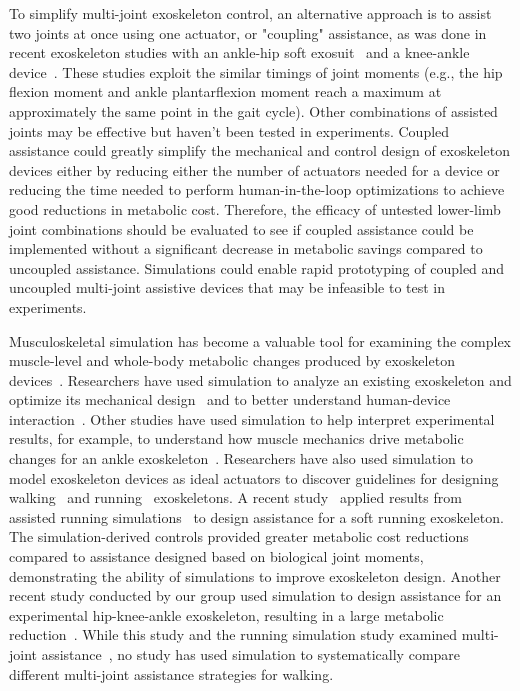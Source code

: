\documentclass[10pt,letterpaper]{article}
\begin{document}
To simplify multi-joint exoskeleton control, an alternative approach is to assist two joints at once using one actuator, or "coupling" assistance, as was done in recent exoskeleton studies with an ankle-hip soft exosuit~\cite{Ding:2017, Panizzolo:2016, Quinlivan:2017, Lee:2018} and a knee-ankle device~\cite{Malcolm:2018}. These studies exploit the similar timings of joint moments (e.g., the hip flexion moment and ankle plantarflexion moment reach a maximum at approximately the same point in the gait cycle). Other combinations of assisted joints may be effective but haven’t been tested in experiments. Coupled assistance could greatly simplify the mechanical and control design of exoskeleton devices either by reducing either the number of actuators needed for a device or reducing the time needed to perform human-in-the-loop optimizations to achieve good reductions in metabolic cost. Therefore, the efficacy of untested lower-limb joint combinations should be evaluated to see if coupled assistance could be implemented without a significant decrease in metabolic savings compared to uncoupled assistance. Simulations could enable rapid prototyping of coupled and uncoupled multi-joint assistive devices that may be infeasible to test in experiments. 

Musculoskeletal simulation has become a valuable tool for examining the complex muscle-level and whole-body metabolic changes produced by exoskeleton devices~\cite{Grabke:2019}. Researchers have used simulation to analyze an existing exoskeleton and optimize its mechanical design~\cite{Manns:2017} and to better understand human-device interaction~\cite{Fournier:2018}. Other studies have used simulation to help interpret experimental results, for example, to understand how muscle mechanics drive metabolic changes for an ankle exoskeleton~\cite{Jackson:2017}. Researchers have also used simulation to model exoskeleton devices as ideal actuators to discover guidelines for designing walking~\cite{Dembia:2017} and running~\cite{Uchida:2016} exoskeletons. A recent study~\cite{Lee:2017} applied results from assisted running simulations~\cite{Uchida:2016} to design assistance for a soft running exoskeleton. The simulation-derived controls provided greater metabolic cost reductions compared to assistance designed based on biological joint moments, demonstrating the ability of simulations to improve exoskeleton design. Another recent study conducted by our group used simulation to design assistance for an experimental hip-knee-ankle exoskeleton, resulting in a large metabolic reduction~\cite{Franks:2020}. While this study and the running simulation study examined multi-joint assistance~\cite{Uchida:2016}, no study has used simulation to systematically compare different multi-joint assistance strategies for walking.
\end{document}
